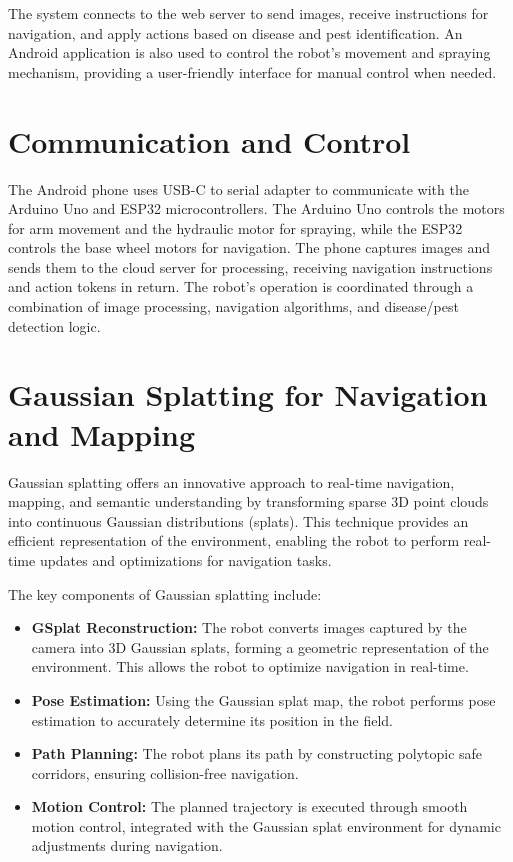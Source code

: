 The system connects to the web server to send images, receive instructions for navigation, and apply actions based on disease and pest identification. An Android application is also used to control the robot’s movement and spraying mechanism, providing a user-friendly interface for manual control when needed.

\section{Communication and Control}
The Android phone uses USB-C to serial adapter to communicate with the Arduino Uno and ESP32 microcontrollers. The Arduino Uno controls the motors for arm movement and the hydraulic motor for spraying, while the ESP32 controls the base wheel motors for navigation. The phone captures images and sends them to the cloud server for processing, receiving navigation instructions and action tokens in return. The robot's operation is coordinated through a combination of image processing, navigation algorithms, and disease/pest detection logic.


\section{Gaussian Splatting for Navigation and Mapping}

Gaussian splatting offers an innovative approach to real-time navigation, mapping, and semantic understanding by transforming sparse 3D point clouds into continuous Gaussian distributions (splats). This technique provides an efficient representation of the environment, enabling the robot to perform real-time updates and optimizations for navigation tasks.

The key components of Gaussian splatting include:
\begin{itemize}
    \item \textbf{GSplat Reconstruction:} The robot converts images captured by the camera into 3D Gaussian splats, forming a geometric representation of the environment. This allows the robot to optimize navigation in real-time. \cite{chen2024splatnavsaferealtimerobot}
    \item \textbf{Pose Estimation:} Using the Gaussian splat map, the robot performs pose estimation to accurately determine its position in the field. \cite{bortolon20246dgs6dposeestimation}
    \item \textbf{Path Planning:} The robot plans its path by constructing polytopic safe corridors, ensuring collision-free navigation.\cite{DURAKLI2022101540}
    \item \textbf{Motion Control:} The planned trajectory is executed through smooth motion control, integrated with the Gaussian splat environment for dynamic adjustments during navigation.\cite{DURAKLI2022101540}
\end{itemize}

